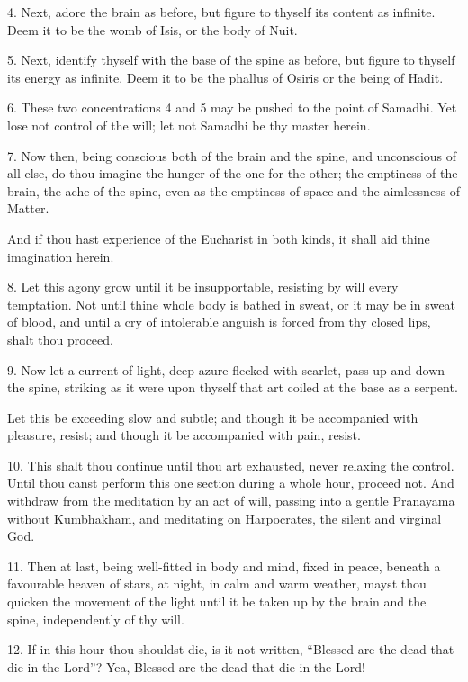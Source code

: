 4. Next, adore the brain as before, but figure to thyself its content as infinite. Deem it to be the womb of Isis, or the body of Nuit.

5. Next, identify thyself with the base of the spine as before, but figure to thyself its energy as infinite. Deem it to be the phallus of Osiris or the being of Hadit.

6. These two concentrations 4 and 5 may be pushed to the point of Samadhi. Yet lose not control of the will; let not Samadhi be thy master herein.

7. Now then, being conscious both of the brain and the spine, and unconscious of all else, do thou imagine the hunger of the one for the other; the emptiness of the brain, the ache of the spine, even as the emptiness of space and the aimlessness of Matter.

And if thou hast experience of the Eucharist in both kinds, it shall aid thine imagination herein.

8. Let this agony grow until it be insupportable, resisting by will every temptation. Not until thine whole body is bathed in sweat, or it may be in sweat of blood, and until a cry of intolerable anguish is forced from thy closed lips, shalt thou proceed.

9. Now let a current of light, deep azure flecked with scarlet, pass up and down the spine, striking as it were upon thyself that art coiled at the base as a serpent.

Let this be exceeding slow and subtle; and though it be accompanied with pleasure, resist; and though it be accompanied with pain, resist.

10. This shalt thou continue until thou art exhausted, never relaxing the control. Until thou canst perform this one section during a whole hour, proceed not. And withdraw from the meditation by an act of will, passing into a gentle Pranayama without Kumbhakham, and meditating on Harpocrates, the silent and virginal God.

11. Then at last, being well-fitted in body and mind, fixed in peace, beneath a favourable heaven of stars, at night, in calm and warm weather, mayst thou quicken the movement of the light until it be taken up by the brain and the spine, independently of thy will.

12. If in this hour thou shouldst die, is it not written, \enquote{Blessed are the dead that die in the Lord}? Yea, Blessed are the dead that die in the Lord!
